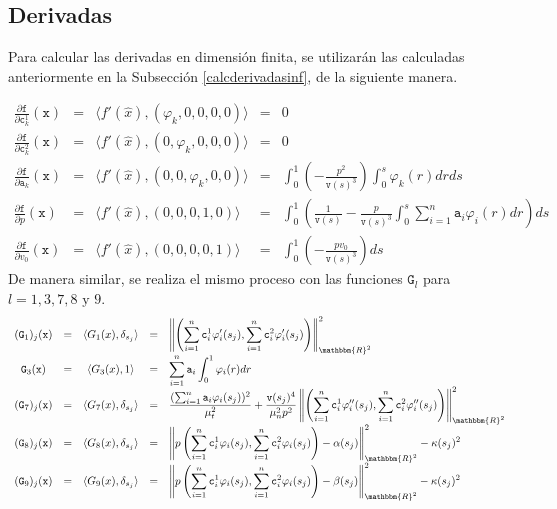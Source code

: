 \documentclass[a4paper,10pt]{book}
\newcommand{\R}{\mathbbm{R}}
\begin{document}
\subsection{Derivadas}

Para calcular las derivadas en dimensión finita, se utilizarán las calculadas anteriormente en la Subsección \ref{calcderivadasinf}, de la siguiente manera.


\[
\begin{array}{ccccl}
\displaystyle\frac{\partial \texttt{f}}{\partial \texttt{c}^1_k}(\texttt{x})&=&\langle f'(\hat x) , (\varphi_k,0,0,0,0)\rangle&=&0\\
\displaystyle\frac{\partial \texttt{f}}{\partial \texttt{c}^2_k}(\texttt{x})&=&\langle f'(\hat x) , (0,\varphi_k,0,0,0)\rangle&=&0\\
\displaystyle\frac{\partial \texttt{f}}{\partial \texttt{a}_k}(\texttt{x})&=&\langle f'(\hat x) , (0,0,\varphi_k,0,0)\rangle&=&\displaystyle\int_0^1\left(-\frac{p^2}{\texttt{v}(s)^3}\right)\int_0^s\varphi_k(r)dr ds\\
\displaystyle \frac{\partial \texttt{f}}{\partial p}(\texttt{x})&=&\langle f'(\hat x) , (0,0,0,1,0)\rangle&=&\displaystyle\int_0^1\left(\frac{1}{\texttt{v}(s)}-\frac{p}{\texttt{v}(s)^3}\int_0^s \displaystyle\sum_{i=1}^n\texttt{a}_i\varphi_i(r)dr\right)ds\\
\displaystyle\frac{\partial \texttt{f}}{\partial v_0}(\texttt{x})&=&\langle f'(\hat x) , (0,0,0,0,1)\rangle&=&\displaystyle\int_0^1\left(-\frac{p v_0}{\texttt{v}(s)^3}\right)ds
\end{array}
\]
De manera similar, se realiza el mismo proceso con las funciones $\texttt{G}_l$ para $l=1,3,7,8\mbox{ y }9$.
\[
\begin{array}{ccccl}
(\texttt{G}_1)_j(\texttt{x})&=&\langle G_1(x) , \delta_{s_j}\rangle&=&\displaystyle\left\| \left(\sum_{i=1}^n\texttt{c}^{1}_i\varphi_i'(s_j), \sum_{i=1}^n\texttt{c}^{2}_i\varphi_i'(s_j)\right) \right\|_{\R^2}^2\\
\texttt{G}_3(\texttt{x})&=&\langle G_3(x) , 1\rangle&=&\displaystyle\sum_{i=1}^n\texttt{a}_i\int_0^1\varphi_i(r)dr\\
(\texttt{G}_7)_j(\texttt{x})&=&\langle G_7(x) , \delta_{s_j}\rangle&=&\displaystyle\frac{(\sum_{i=1}^n\texttt{a}_i\varphi_i(s_j))^2}{\mu_t^2}+\frac{\texttt{v}(s_j)^4}{\mu_n^2p^2}\left\| \left(\sum_{i=1}^n\texttt{c}^{1}_i\varphi_i''(s_j), \sum_{i=1}^n\texttt{c}^{2}_i\varphi_i''(s_j)\right) \right\|_{\R^2}^2\\
(\texttt{G}_8)_j(\texttt{x})&=&\langle G_8(x) , \delta_{s_j}\rangle&=&\displaystyle\left\| p\left (\sum_{i=1}^n\texttt{c}^{1}_i\varphi_i(s_j), \sum_{i=1}^n\texttt{c}^{2}_i\varphi_i(s_j)\right)-\alpha(s_j) \right\|_{\R^2}^2-\kappa(s_j)^2\\[11pt]
(\texttt{G}_9)_j(\texttt{x})&=&\langle G_9(x) , \delta_{s_j}\rangle&=&\displaystyle\left\| p\left (\sum_{i=1}^n\texttt{c}^{1}_i\varphi_i(s_j), \sum_{i=1}^n\texttt{c}^{2}_i\varphi_i(s_j)\right)-\beta(s_j) \right\|_{\R^2}^2-\kappa(s_j)^2
\end{array}
\]
\end{document}
